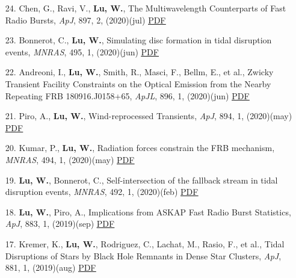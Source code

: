\begin{itemize}[leftmargin=0.65cm]
\vspace{-0.1cm}
\item[24.]{Chen, G., Ravi, V., {\bf Lu, W.}, {The Multiwavelength Counterparts of Fast Radio Bursts}, {\it ApJ}, 897, 2, (2020)(jul) \href{https://ui.adsabs.harvard.edu/abs/2020ApJ...897..146C}{\underline{PDF}}}

\vspace{-0.1cm}
\item[23.]{Bonnerot, C., {\bf Lu, W.}, {Simulating disc formation in tidal disruption events}, {\it MNRAS}, 495, 1, (2020)(jun) \href{https://ui.adsabs.harvard.edu/abs/2020MNRAS.495.1374B}{\underline{PDF}}}

\vspace{-0.1cm}
\item[22.]{Andreoni, I., {\bf Lu, W.}, Smith, R., Masci, F., Bellm, E., et al., {Zwicky Transient Facility Constraints on the Optical Emission from the Nearby Repeating FRB 180916.J0158+65}, {\it ApJL}, 896, 1, (2020)(jun) \href{https://ui.adsabs.harvard.edu/abs/2020ApJ...896L...2A}{\underline{PDF}}}

\vspace{-0.1cm}
\item[21.]{Piro, A., {\bf Lu, W.}, {Wind-reprocessed Transients}, {\it ApJ}, 894, 1, (2020)(may) \href{https://ui.adsabs.harvard.edu/abs/2020ApJ...894....2P}{\underline{PDF}}}

\vspace{-0.1cm}
\item[20.]{Kumar, P., {\bf Lu, W.}, {Radiation forces constrain the FRB mechanism}, {\it MNRAS}, 494, 1, (2020)(may) \href{https://ui.adsabs.harvard.edu/abs/2020MNRAS.494.1217K}{\underline{PDF}}}

\vspace{-0.1cm}
\item[19.]{{\bf Lu, W.}, Bonnerot, C., {Self-intersection of the fallback stream in tidal disruption events}, {\it MNRAS}, 492, 1, (2020)(feb) \href{https://ui.adsabs.harvard.edu/abs/2020MNRAS.492..686L}{\underline{PDF}}}

\vspace{-0.1cm}
\item[18.]{{\bf Lu, W.}, Piro, A., {Implications from ASKAP Fast Radio Burst Statistics}, {\it ApJ}, 883, 1, (2019)(sep) \href{https://ui.adsabs.harvard.edu/abs/2019ApJ...883...40L}{\underline{PDF}}}

\vspace{-0.1cm}
\item[17.]{Kremer, K., {\bf Lu, W.}, Rodriguez, C., Lachat, M., Rasio, F., et al., {Tidal Disruptions of Stars by Black Hole Remnants in Dense Star Clusters}, {\it ApJ}, 881, 1, (2019)(aug) \href{https://ui.adsabs.harvard.edu/abs/2019ApJ...881...75K}{\underline{PDF}}}


\end{itemize}

